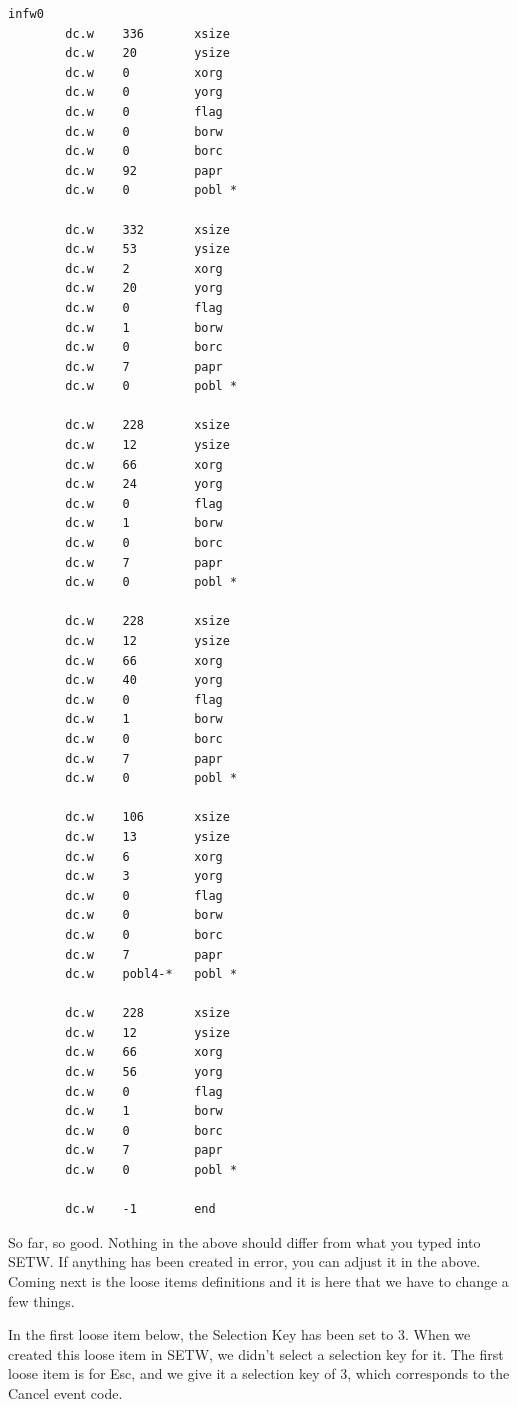 \begin{lstlisting}[firstnumber=1,caption={LibGenWin\_asm}]
infw0
        dc.w    336       xsize
        dc.w    20        ysize
        dc.w    0         xorg
        dc.w    0         yorg
        dc.w    0         flag
        dc.w    0         borw
        dc.w    0         borc
        dc.w    92        papr
        dc.w    0         pobl *

        dc.w    332       xsize
        dc.w    53        ysize
        dc.w    2         xorg
        dc.w    20        yorg
        dc.w    0         flag
        dc.w    1         borw
        dc.w    0         borc
        dc.w    7         papr
        dc.w    0         pobl *

        dc.w    228       xsize
        dc.w    12        ysize
        dc.w    66        xorg
        dc.w    24        yorg
        dc.w    0         flag
        dc.w    1         borw
        dc.w    0         borc
        dc.w    7         papr
        dc.w    0         pobl *

        dc.w    228       xsize
        dc.w    12        ysize
        dc.w    66        xorg
        dc.w    40        yorg
        dc.w    0         flag
        dc.w    1         borw
        dc.w    0         borc
        dc.w    7         papr
        dc.w    0         pobl *

        dc.w    106       xsize
        dc.w    13        ysize
        dc.w    6         xorg
        dc.w    3         yorg
        dc.w    0         flag
        dc.w    0         borw
        dc.w    0         borc
        dc.w    7         papr
        dc.w    pobl4-*   pobl *

        dc.w    228       xsize
        dc.w    12        ysize
        dc.w    66        xorg
        dc.w    56        yorg
        dc.w    0         flag
        dc.w    1         borw
        dc.w    0         borc
        dc.w    7         papr
        dc.w    0         pobl *

        dc.w    -1        end

\end{lstlisting}

So far, so good. Nothing in the above should differ from what you
    typed into SETW. If anything has been created
    in error, you can adjust it in the above. Coming next is the loose items
    definitions and it is here that we have to change a few things.

In the first loose item below, the Selection Key has been set to 3.
    When we created this loose item in SETW, we
    didn't select a selection key for it. The first loose item is for Esc, and
    we give it a selection key of 3, which corresponds to the Cancel event
    code.

